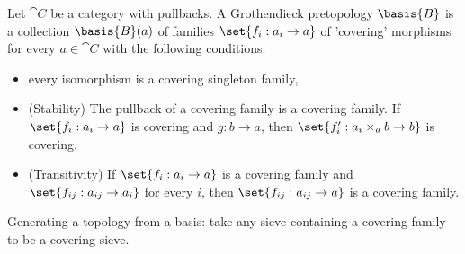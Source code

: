 \begin{definition}[Basis]
Let $\cat{C}$ be a category with pullbacks.
A Grothendieck pretopology $\basis{B}$ is a collection $\basis{B}(a)$ 
of families $\set{f_i:a_i\rightarrow a}$ of 'covering' morphisms 
for every $a\in \cat{C}$ with the following conditions.

\begin{itemize}
	\item  every isomorphism is a covering singleton family,
	\item (Stability) The pullback of a covering family is a covering family. 
		If  $\set{f_i:a_i\rightarrow a}$ is covering and $g:b\rightarrow a$, then $\set{f'_i:a_i\times_a b\rightarrow b}$ is covering.
	\item (Transitivity) If $\set{f_i:a_i\rightarrow a}$ is a covering family 
		and $\set{ f_{ij}: a_{ij} \rightarrow a_i}$ for every $i$, 
		then $\set{f_{ij}:a_{ij}\rightarrow a}$ is a covering family.
\end{itemize}

Generating a topology from a basis: take any sieve containing a covering family to be a covering sieve.
\end{definition}